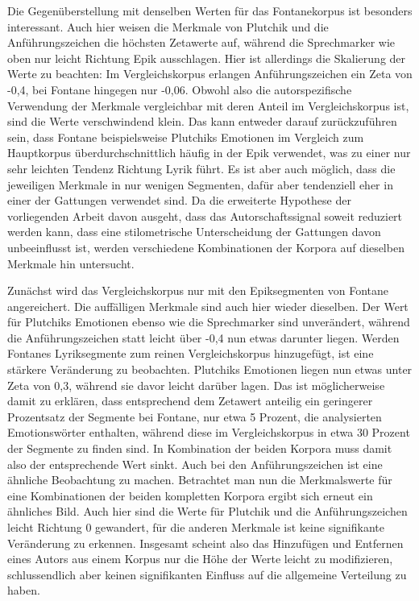 \documentclass[a4paper,10p]{article}
\begin{document}
Die Gegenüberstellung mit denselben Werten für das Fontanekorpus ist besonders interessant. Auch hier weisen die Merkmale von Plutchik und die Anführungszeichen die höchsten Zetawerte auf, während die Sprechmarker wie oben nur leicht Richtung Epik ausschlagen. Hier ist allerdings die Skalierung der Werte zu beachten: Im Vergleichskorpus erlangen Anführungszeichen ein Zeta von -0,4, bei Fontane hingegen nur -0,06. Obwohl also die autorspezifische Verwendung der Merkmale vergleichbar mit deren Anteil im Vergleichskorpus ist, sind die Werte verschwindend klein. Das kann entweder darauf zurückzuführen sein, dass Fontane beispielsweise Plutchiks Emotionen im Vergleich zum Hauptkorpus überdurchschnittlich häufig in der Epik verwendet, was zu einer nur sehr leichten Tendenz Richtung Lyrik führt. Es ist aber auch möglich, dass die jeweiligen Merkmale in nur wenigen Segmenten, dafür aber tendenziell eher in einer der Gattungen verwendet sind. Da die erweiterte Hypothese der vorliegenden Arbeit davon ausgeht, dass das Autorschaftssignal soweit reduziert werden kann, dass eine stilometrische Unterscheidung der Gattungen davon unbeeinflusst ist, werden verschiedene Kombinationen der Korpora auf dieselben Merkmale hin untersucht. \par 

Zunächst wird das Vergleichskorpus nur mit den Epiksegmenten von Fontane angereichert. Die auffälligen Merkmale sind auch hier wieder dieselben. Der Wert für Plutchiks Emotionen ebenso wie die Sprechmarker sind unverändert, während die Anführungszeichen statt leicht über -0,4 nun etwas darunter liegen. Werden Fontanes Lyriksegmente zum reinen Vergleichskorpus hinzugefügt, ist eine stärkere Veränderung zu beobachten. Plutchiks Emotionen liegen nun etwas unter Zeta von 0,3, während sie davor leicht darüber lagen. Das ist möglicherweise damit zu erklären, dass entsprechend dem Zetawert anteilig ein geringerer Prozentsatz der Segmente bei Fontane, nur etwa 5 Prozent, die analysierten Emotionswörter enthalten, während diese im Vergleichskorpus in etwa 30 Prozent der Segmente zu finden sind. In Kombination der beiden Korpora muss damit also der entsprechende Wert sinkt. Auch bei den Anführungszeichen ist eine ähnliche Beobachtung zu machen. Betrachtet man nun die Merkmalswerte für eine Kombinationen der beiden kompletten Korpora ergibt sich erneut ein ähnliches Bild. Auch hier sind die Werte für Plutchik und die Anführungszeichen leicht Richtung 0 gewandert, für die anderen Merkmale ist keine signifikante Veränderung zu erkennen. Insgesamt scheint also das Hinzufügen und Entfernen eines Autors aus einem Korpus nur die Höhe der Werte leicht zu modifizieren, schlussendlich aber keinen signifikanten Einfluss auf die allgemeine Verteilung zu haben. \par 
\end{document}
